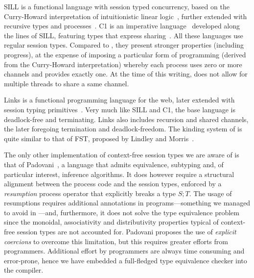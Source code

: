 SILL is a functional language with session typed concurrency, based on
the Curry-Howard interpretation of intuitionistic linear
logic~\cite{DBLP:conf/concur/CairesP10}, further extended with
recursive types and
processes~\cite{Toninho:phd,DBLP:conf/esop/ToninhoCP13}.
%
C1 is an imperative language~\cite{Pfenning:C1} developed along the
lines of SILL, featuring types that express
sharing~\cite{DBLP:journals/pacmpl/BalzerP17}.
%
All these languages use regular session types. Compared to \freest,
they present stronger properties (including progress), at the expense
of imposing a particular form of programming (derived from the
Curry-Howard interpretation) whereby each process uses zero or more
channels and provides exactly one. At the time of this writing,
\freest{} does not allow for multiple threads to share a same channel.

Links is a functional programming language for the web, later extended
with session typing
primitives~\cite{DBLP:conf/fmco/CooperLWY06,DBLP:conf/esop/LindleyM15,Lindley.Morris_Lightweight.functional.session.types}. Very
much like SILL and C1, the base language is deadlock-free and
terminating. Links also includes recursion and shared channels, the
later foregoing termination and deadlock-freedom.
%
The kinding system of \freest{} is quite similar to that of FST,
proposed by Lindley and
Morris~\cite{Lindley.Morris_Lightweight.functional.session.types}.

The only other implementation of context-free session types we are
aware of is that of Padovani~\cite{DBLP:conf/esop/Padovani17}, a
language that admits equivalence, subtyping and, of particular
interest, inference algorithms. It does however require a structural
alignment between the process code and the session types, enforced by
a \emph{resumption} process operator that explicitly breaks a type
$S;T$. The usage of resumptions requires additional annotations in
programs---something we managed to avoid in \freest---and,
furthermore, it does not solve the type equivalence problem since the
monoidal, associativity and distributivity properties typical of
context-free session types are not accounted for. Padovani proposes
the use of \emph{explicit coercions} to overcome this limitation, but
this requires greater efforts from programmers.  Additional effort by
programmers are always time consuming and error-prone, hence we have
embedded a full-fledged type equivalence checker into the compiler.

